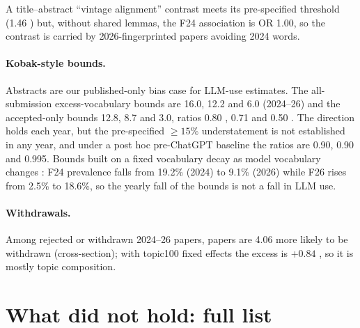 A title--abstract ``vintage alignment'' contrast meets its pre-specified threshold (1.46 ) but, without shared lemmas, the F24 association is OR 1.00, so the contrast is carried by 2026-fingerprinted papers avoiding 2024 words.

\paragraph{Kobak-style bounds.}
Abstracts are our published-only bias case for LLM-use estimates. The all-submission excess-vocabulary bounds are 16.0, 12.2 and 6.0\pp{} (2024--26) and the accepted-only bounds 12.8, 8.7 and 3.0\pp, ratios 0.80 , 0.71  and 0.50 . The direction holds each year, but the pre-specified $\geq 15\%$ understatement is not established in any year, and under a post hoc pre-ChatGPT baseline the ratios are 0.90, 0.90 and 0.995. Bounds built on a fixed vocabulary decay as model vocabulary changes \citep{geng2025coevolution}: F24 prevalence falls from 19.2\% (2024) to 9.1\% (2026) while F26 rises from 2.5\% to 18.6\%, so the yearly fall of the bounds is not a fall in LLM use.

\paragraph{Withdrawals.}
Among rejected or withdrawn 2024--26 papers, \NAME{} papers are 4.06\pp{} more likely to be withdrawn (cross-section); with topic100 fixed effects the excess is $+0.84$\pp{} , so it is mostly topic composition.

\section{What did not hold: full list}
\label{app:nt-failures}

